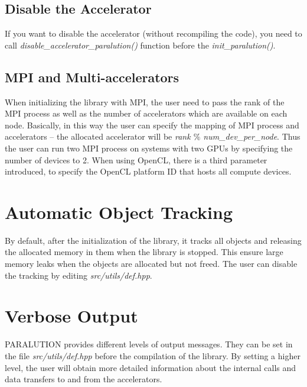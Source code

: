 \subsection{Disable the Accelerator}

If you want to disable the accelerator (without recompiling the code), you need to call \emph{disable\_accelerator\_paralution()} function before the \emph{init\_paralution()}.

\subsection{MPI and Multi-accelerators}

When initializing the library with MPI, the user need to pass the rank of the MPI process as well as the number of accelerators which are available on each node. Basically, in this way the user can specify the mapping of MPI process and accelerators -- the allocated accelerator will be \emph{rank $\%$ num\_dev\_per\_node}. Thus the user can run two MPI process on systems with two GPUs by specifying the number of devices to 2. When using OpenCL, there is a third parameter introduced, to specify the OpenCL platform ID that hosts all compute devices.





\section{Automatic Object Tracking}

By default, after the initialization of the library, it tracks all objects and releasing the allocated memory in them when the library is stopped. This ensure large memory leaks when the objects are allocated but not freed. The user can disable the tracking by editing \emph{src/utils/def.hpp}.


\section{Verbose Output}

PARALUTION provides different levels of output messages. They can be set in the file \emph{src/utils/def.hpp} before the compilation of the library. By setting a higher level, the user will obtain more detailed information about the internal calls and data transfers to and from the accelerators.

